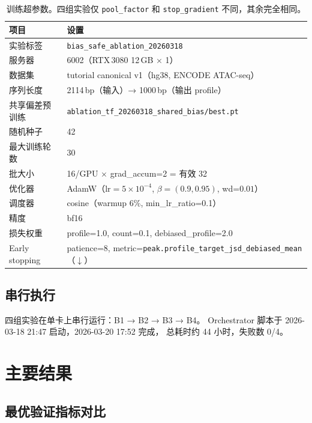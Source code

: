 \documentclass[11pt,a4paper]{ctexart}
\begin{document}
\begin{table}[H]
\centering
\small
\caption{训练超参数。四组实验仅 \texttt{pool\_factor} 和 \texttt{stop\_gradient} 不同，其余完全相同。}
\label{tab:train_config}
\begin{tabular}{ll}
\toprule
项目 & 设置 \\
\midrule
实验标签 & \texttt{bias\_safe\_ablation\_20260318} \\
服务器 & 6002（RTX\,3080 12\,GB $\times$ 1） \\
数据集 & tutorial canonical v1（hg38, ENCODE ATAC-seq） \\
序列长度 & 2114\,bp（输入）→ 1000\,bp（输出 profile） \\
共享偏差预训练 & \texttt{ablation\_tf\_20260318\_shared\_bias/best.pt} \\
随机种子 & 42 \\
最大训练轮数 & 30 \\
批大小 & 16/GPU $\times$ grad\_accum=2 = 有效 32 \\
优化器 & AdamW（$\mathrm{lr}=5\times 10^{-4}$, $\beta=(0.9, 0.95)$, wd=$0.01$） \\
调度器 & cosine（warmup 6\%, min\_lr\_ratio=0.1） \\
精度 & bf16 \\
损失权重 & profile=1.0, count=0.1, debiased\_profile=2.0 \\
Early stopping & patience=8, metric=\texttt{peak.profile\_target\_jsd\_debiased\_mean}（$\downarrow$） \\
\bottomrule
\end{tabular}
\end{table}

\subsection{串行执行}

四组实验在单卡上串行运行：B1 → B2 → B3 → B4。
Orchestrator 脚本于 2026-03-18 21:47 启动，2026-03-20 17:52 完成，
总耗时约 44 小时，失败数 0/4。

\section{主要结果}

\subsection{最优验证指标对比}
\end{document}
